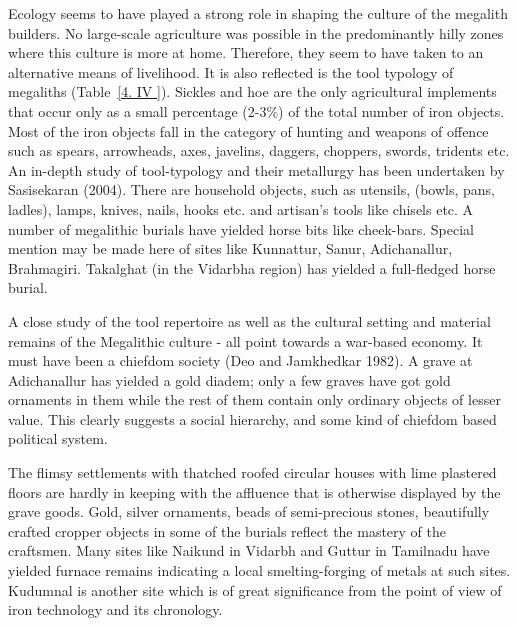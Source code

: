 Ecology seems to have played a strong role in shaping the culture of the megalith builders. No large-scale agriculture was possible in the predominantly hilly zones where this culture is more at home. Therefore, they seem to have taken to an alternative means of livelihood. It is also reflected is the tool typology of megaliths (Table~\ref{4. IV	}). Sickles and hoe are the only agricultural implements that occur only as a small percentage (2-3\%) of the total number of iron objects. Most of the iron objects fall in the category of hunting and weapons of offence such as spears, arrowheads, axes, javelins, daggers, choppers, swords, tridents etc. An in-depth study of tool-typology and their metallurgy has been undertaken by Sasisekaran (2004).  There are household objects, such as utensils, (bowls, pans, ladles), lamps, knives, nails, hooks etc. and artisan's tools like chisels etc. A number of megalithic burials have yielded horse bits like cheek-bars. Special mention may be made here of sites like Kunnattur, Sanur, Adichanallur, Brahmagiri. Takalghat (in the Vidarbha region) has yielded a full-fledged horse burial.

A close study of the tool repertoire as well as the cultural setting and material remains of the Megalithic culture - all point towards a war-based economy. It must have been a chiefdom society (Deo and Jamkhedkar 1982). A grave at Adichanallur has yielded a gold diadem; only a few graves have got gold ornaments in them while the rest of them contain only ordinary objects of lesser value. This clearly suggests a social hierarchy, and some kind of chiefdom based political system.

The flimsy settlements with thatched roofed circular houses with lime plastered floors are hardly in keeping with the affluence that is otherwise displayed by the grave goods. Gold, silver ornaments, beads of semi-precious stones, beautifully crafted cropper objects in some of the burials reflect the mastery of the craftsmen. Many sites like Naikund in Vidarbh and Guttur in Tamilnadu have yielded furnace remains indicating a local smelting-forging of metals at such sites. Kudumnal is another site which is of great significance from the point of view of iron technology and its chronology. 


